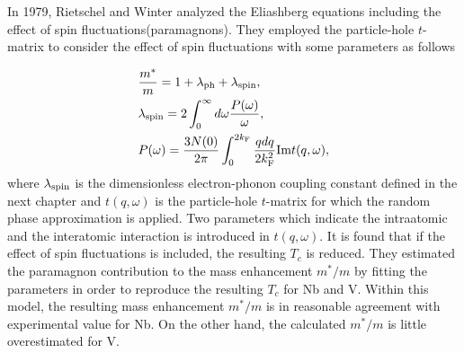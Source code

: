 In 1979, Rietschel and Winter\cite{Rietschel1979} analyzed the Eliashberg
equations including the effect of spin fluctuations(paramagnons). They employed the particle-hole 
$t$-matrix\cite{Parks1969,Berk1966,Schrieffer1968} to consider the effect of spin fluctuations with 
some parameters as follows

\begin{equation}
	\begin{split}
		& \frac{m^{\ast}}{m} = 1 + \lambda_{\rm ph} + \lambda_{\rm spin}, \\
		& \lambda_{\rm spin} = 2\int_{0}^{\infty} d\omega \frac{P(\omega)}{\omega}, \\
		& P(\omega) = \frac{3N(0)}{2\pi} \int_{0}^{2k_{\rm F}} 
		\frac{qdq}{2k_{\rm F}^2} {\rm Im} t(q, \omega),
	\label{eq:eliash}
\end{split}
\end{equation}
%
where $\lambda_{\rm spin}$ is the dimensionless electron-phonon coupling constant
defined in the next chapter and $t(q,\omega)$ is the particle-hole $t$-matrix for which the
random phase approximation\cite{Schrieffer} is applied. Two parameters which indicate the 
intraatomic and the interatomic interaction is introduced in $t(q,\omega)$.
It is found that if the effect of spin fluctuations is included, the resulting $T_c$ is reduced.
They estimated the paramagnon contribution to the mass enhancement $m^{\ast}/m$ 
by fitting the parameters in order to reproduce the resulting $T_c$ for Nb and V.
Within this model, the resulting mass enhancement $m^{\ast}/m$ is in reasonable agreement 
with experimental value for Nb. On the other hand, the calculated $m^{\ast}/m$ is little 
overestimated for V.


